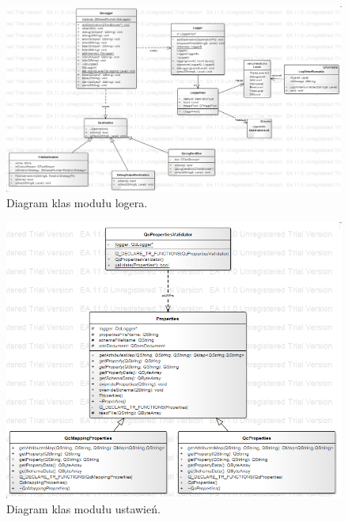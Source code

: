 \documentclass[12pt]{report}
\begin{document}
\begin{figure}[h]
	\centering
	\includegraphics[width=1.4\textwidth, angle=90]{images/logger.png}
	\caption{Diagram klas modułu logera.}
\end{figure}
\FloatBarrier

\begin{figure}[h]
	\centering
	\includegraphics[width=1\textwidth]{images/properties.png}
	\caption{Diagram klas modułu ustawień.}
\end{figure}
\FloatBarrier	
\end{document}
